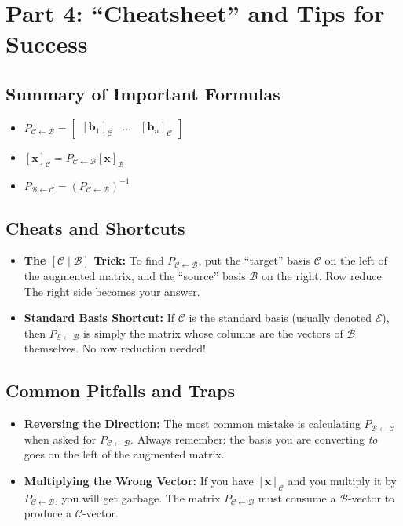\documentclass[11pt]{article}
\begin{document}
\section{Part 4: ``Cheatsheet'' and Tips for Success}

\subsection{Summary of Important Formulas}
\begin{itemize}
    \item $P_{\mathcal{C} \leftarrow \mathcal{B}} = \begin{bmatrix} [\mathbf{b}_1]_{\mathcal{C}} & \dots & [\mathbf{b}_n]_{\mathcal{C}} \end{bmatrix}$
    \item $[\mathbf{x}]_{\mathcal{C}} = P_{\mathcal{C} \leftarrow \mathcal{B}} [\mathbf{x}]_{\mathcal{B}}$
    \item $P_{\mathcal{B} \leftarrow \mathcal{C}} = (P_{\mathcal{C} \leftarrow \mathcal{B}})^{-1}$
\end{itemize}

\subsection{Cheats and Shortcuts}
\begin{itemize}
    \item \textbf{The $[ \mathcal{C} \mid \mathcal{B} ]$ Trick:} To find $P_{\mathcal{C} \leftarrow \mathcal{B}}$, put the ``target'' basis $\mathcal{C}$ on the left of the augmented matrix, and the ``source'' basis $\mathcal{B}$ on the right. Row reduce. The right side becomes your answer.
    \item \textbf{Standard Basis Shortcut:} If $\mathcal{C}$ is the standard basis (usually denoted $\mathcal{E}$), then $P_{\mathcal{E} \leftarrow \mathcal{B}}$ is simply the matrix whose columns are the vectors of $\mathcal{B}$ themselves. No row reduction needed!
\end{itemize}

\subsection{Common Pitfalls and Traps}
\begin{itemize}
    \item \textbf{Reversing the Direction:} The most common mistake is calculating $P_{\mathcal{B} \leftarrow \mathcal{C}}$ when asked for $P_{\mathcal{C} \leftarrow \mathcal{B}}$. Always remember: the basis you are converting \textit{to} goes on the left of the augmented matrix.
    \item \textbf{Multiplying the Wrong Vector:} If you have $[\mathbf{x}]_{\mathcal{C}}$ and you multiply it by $P_{\mathcal{C} \leftarrow \mathcal{B}}$, you will get garbage. The matrix $P_{\mathcal{C} \leftarrow \mathcal{B}}$ must consume a $\mathcal{B}$-vector to produce a $\mathcal{C}$-vector.
\end{itemize}
\end{document}
